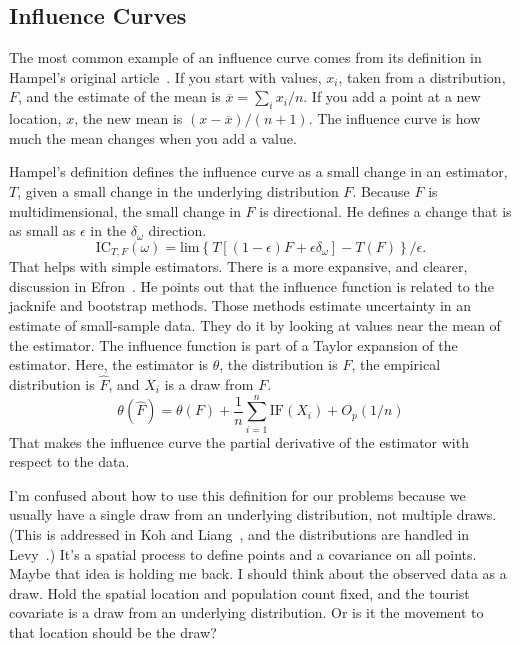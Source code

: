 \documentclass{article}
\begin{document}
\subsection{Influence Curves}

The most common example of an influence curve comes from its definition in Hampel's original article~\cite{hampel1974influence}. If you start with values, $x_i$, taken from a distribution, $F$, and the estimate of the mean is $\overbar{x} = \sum_i x_i / n$. If you add a point at a new location, $x$, the new mean is $(x-\overbar{x})/(n+1).$ The influence curve is how much the mean changes when you add a value.

Hampel's definition defines the influence curve as a small change in an estimator, $T$, given a small change in the underlying distribution $F$. Because $F$ is multidimensional, the small change in $F$ is directional. He defines a change that is as small as $\epsilon$ in the $\delta_\omega$ direction.
\begin{equation}
  \mbox{IC}_{T,F}(\omega)=\mbox{lim}\left\{T[(1-\epsilon)F+\epsilon\delta_\omega]-T(F)\right\}/\epsilon.
\end{equation}
That helps with simple estimators. There is a more expansive, and clearer, discussion in Efron~\cite{efron1982jackknife}. He points out that the influence function is related to the jacknife and bootstrap methods. Those methods estimate uncertainty in an estimate of small-sample data. They do it by looking at values near the mean of the estimator. The influence function is part of a Taylor expansion of the estimator. Here, the estimator is $\theta$, the distribution is $F$, the empirical distribution is $\hat{F}$, and $X_i$ is a draw from $F$.
\begin{equation}
  \theta(\hat{F})=\theta(F) + \frac{1}{n}\sum_{i=1}^{n} \mbox{IF}(X_i) + O_p\left(1/n\right)
\end{equation}
That makes the influence curve the partial derivative of the estimator with respect to the data.

I'm confused about how to use this definition for our problems because we usually have a single draw from an underlying distribution, not multiple draws. (This is addressed in Koh and Liang~\cite{koh2017understanding}, and the distributions are handled in Levy~\cite{levy2019tutorial}.) It's a spatial process to define points and a covariance on all points. Maybe that idea is holding me back. I should think about the observed data as a draw. Hold the spatial location and population count fixed, and the tourist covariate is a draw from an underlying distribution. Or is it the movement to that location should be the draw?
\end{document}
